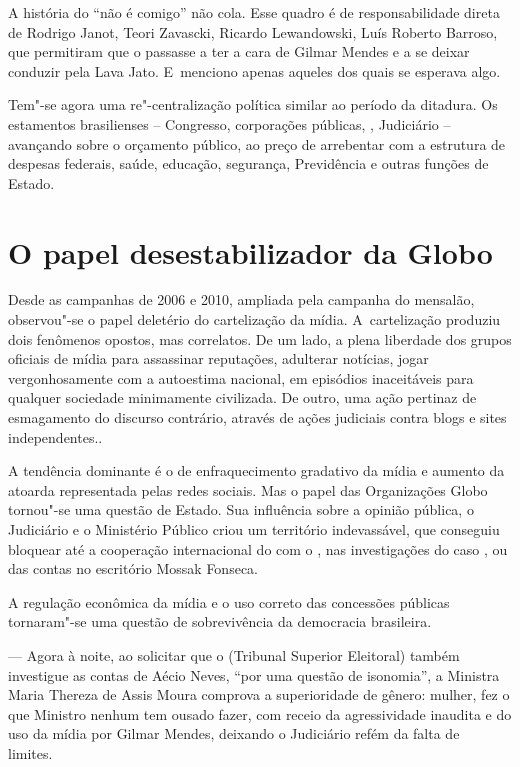 A história do ``não é comigo'' não cola. Esse quadro é de
responsabilidade direta de Rodrigo Janot, Teori Zavascki, Ricardo
Lewandowski, Luís Roberto Barroso, que permitiram que o  passasse a
ter a cara de Gilmar Mendes e a se deixar conduzir pela Lava Jato. E~menciono apenas aqueles dos quais se esperava algo.

Tem"-se agora uma re"-centralização política similar ao período da
ditadura. Os estamentos brasilienses -- Congresso, corporações públicas,
, Judiciário -- avançando sobre o orçamento público, ao preço de
arrebentar com a estrutura de despesas federais, saúde, educação,
segurança, Previdência e outras funções de Estado.

\section{O papel desestabilizador da Globo}

Desde as campanhas de 2006 e 2010, ampliada pela campanha do mensalão,
observou"-se o papel deletério do cartelização da mídia. A~cartelização
produziu dois fenômenos opostos, mas correlatos. De um lado, a plena
liberdade dos grupos oficiais de mídia para assassinar reputações,
adulterar notícias, jogar vergonhosamente com a autoestima nacional, em
episódios inaceitáveis para qualquer sociedade minimamente civilizada.
De outro, uma ação pertinaz de esmagamento do discurso contrário,
através de ações judiciais contra blogs e sites independentes..

A tendência dominante é o de enfraquecimento gradativo da mídia e
aumento da atoarda representada pelas redes sociais. Mas o papel das
Organizações Globo tornou"-se uma questão de Estado. Sua influência sobre
a opinião pública, o Judiciário e o Ministério Público criou um
território indevassável, que conseguiu bloquear até a cooperação
internacional do  com o , nas investigações do caso , ou das
contas no escritório Mossak Fonseca.

A regulação econômica da mídia e o uso correto das concessões públicas
tornaram"-se uma questão de sobrevivência da democracia brasileira.~

 --- Agora à noite, ao solicitar que o  (Tribunal Superior
Eleitoral) também investigue as contas de Aécio Neves, ``por uma questão
de isonomia'', a Ministra Maria Thereza de Assis Moura comprova a
superioridade de gênero: mulher, fez o que Ministro nenhum tem ousado
fazer, com receio da agressividade inaudita e do uso da mídia por Gilmar
Mendes, deixando o Judiciário refém da falta de limites.~
